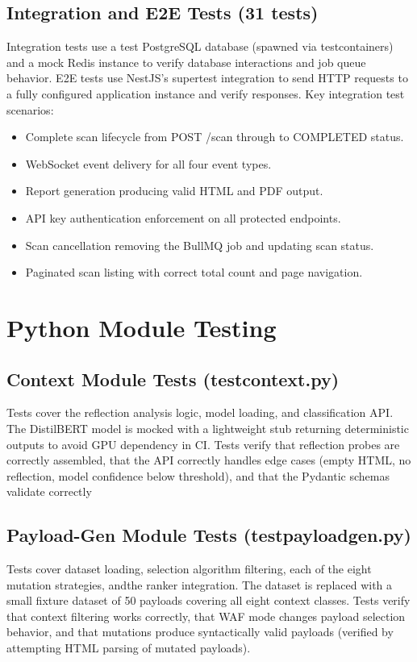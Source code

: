 \subsection{Integration and E2E Tests (31 tests)}
Integration tests use a test PostgreSQL database (spawned via testcontainers) and a mock Redis instance to verify database interactions and job queue behavior. E2E tests use NestJS's supertest integration to send HTTP requests to a fully configured application instance and verify responses. Key integration test scenarios:
\begin{itemize}
    \item Complete scan lifecycle from POST /scan through to COMPLETED status.
    \item WebSocket event delivery for all four event types.
    \item Report generation producing valid HTML and PDF output.
    \item  API key authentication enforcement on all protected endpoints.
    \item Scan cancellation removing the BullMQ job and updating scan status.
    \item Paginated scan listing with correct total count and page navigation.
\end{itemize}
\section{ Python Module Testing}
\subsection{Context Module Tests (test\textunderscore context.py)}
Tests cover the reflection analysis logic, model loading, and classification API. The DistilBERT model is mocked with a lightweight stub returning deterministic outputs to avoid GPU dependency in CI. Tests verify that reflection probes are correctly assembled, that the API correctly handles edge cases (empty HTML, no reflection, model confidence below threshold), and that the Pydantic schemas validate correctly
\subsection{ Payload-Gen Module Tests (test\textunderscore payload\textunderscore gen.py)}
Tests cover dataset loading, selection algorithm filtering, each of the eight mutation strategies, andthe ranker integration. The dataset is replaced with a small fixture dataset of 50 payloads covering all eight context classes. Tests verify that context filtering works correctly, that WAF mode changes payload selection behavior, and that mutations produce syntactically valid payloads (verified by attempting HTML parsing of mutated payloads).
